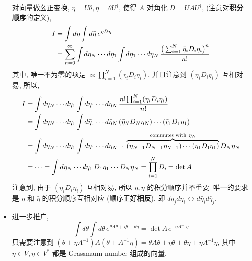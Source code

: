 \begin{itemize}
	\begin{tcolorbox}[title=calculation:]
		对向量做幺正变换, $\eta = U \theta, \bar{\eta} = \bar{\theta} U^\dag$, 使得 $A$ 对角化 $D = U A U^\dag$, (注意对\textbf{积分顺序}的定义),
		\begin{align}
			I &= \int d\eta \int d\bar{\eta} \, e^{\bar{\eta} D \eta} \notag \\
			&= \sum_{n = 0}^\infty \int d\eta_N \cdots d\eta_1 \int d\bar{\eta}_1 \cdots d\bar{\eta}_N \, \frac{\big( \sum_{i = 1}^N \bar{\eta}_i D_i \eta_i \big)^n}{n!}
		\end{align}
		其中, 唯一不为零的项是 $\propto \prod_{i = 1}^N (\bar{\eta}_i D_i \eta_i)$, 并且注意到 $(\bar{\eta}_i D_i \eta_i)$ 互相对易, 所以,
		\begin{align}
			I &= \int d\eta_N \cdots d\eta_1 \int d\bar{\eta}_1 \cdots d\bar{\eta}_N \, \frac{n! \prod_{i = 1}^N (\bar{\eta}_i D_i \eta_i)}{n!} \notag \\
			&= \int d\eta_N \cdots d\eta_1 \int d\bar{\eta}_1 \cdots d\bar{\eta}_N \, (\bar{\eta}_N D_N \eta_N) \cdots (\bar{\eta}_1 D_1 \eta_1) \notag \\
			&= \int d\eta_N \cdots d\eta_1 \int d\bar{\eta}_1 \cdots d\bar{\eta}_{N - 1} \, \overbrace{(\bar{\eta}_{N - 1} D_{N - 1} \eta_{N - 1}) \cdots (\bar{\eta}_1 D_1 \eta_1)}^{\text{commutes with} \ \eta_N} D_N \eta_N \notag \\
			&= \cdots = \int d\eta_N \cdots d\eta_1 \, D_1 \eta_1 \cdots D_N \eta_N = \prod_{i = 1}^N D_i = \det A
		\end{align}
		注意到, 由于 $(\bar{\eta}_i D_i \eta_i)$ 互相对易, 所以 $\eta, \bar{\eta}$ 的积分顺序并不重要, 唯一的要求是 $\eta$ 和 $\bar{\eta}$ 的积分顺序互相对应 (顺序正好\textbf{相反}), 即 $d\eta_j d\eta_i \leftrightarrow d\bar{\eta}_i d\bar{\eta}_j$.
	\end{tcolorbox}
	
	\item 进一步推广,
	\begin{equation} \label{10.1.13}
		\int d\theta \int d\bar{\theta} \, e^{\bar{\theta} A \theta + \bar{\eta} \theta + \bar{\theta} \eta} = \det A \, e^{- \bar{\eta} A^{- 1} \eta}
	\end{equation}
	只需要注意到 $(\bar{\theta} + \bar{\eta} A^{- 1}) A (\theta + A^{- 1} \eta) = \bar{\theta} A \theta + \bar{\eta} \theta + \bar{\theta} \eta + \bar{\eta} A^{- 1} \eta$, 其中 $\eta \in V, \bar{\eta} \in V^*$ 都是 Grassmann number 组成的向量.
\end{itemize}

